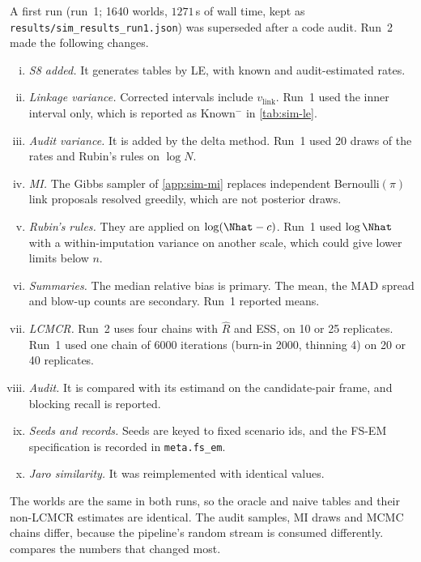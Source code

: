 A first run (run~1; 1640 worlds, $1271$\,s of wall time, kept as \texttt{results/sim\_results\_run1.json}) was superseded after a code audit. Run~2 made the following changes.
\begin{enumerate}[(i)]
  \item \emph{S8 added.} It generates tables by LE, with known and audit-estimated rates.
  \item \emph{Linkage variance.} Corrected intervals include $v_{\mathrm{link}}$. Run~1 used the inner interval only, which is reported as Known$^-$ in \cref{tab:sim-le}.
  \item \emph{Audit variance.} It is added by the delta method. Run~1 used 20 draws of the rates and Rubin's rules on $\log N$.
  \item \emph{MI.} The Gibbs sampler of \cref{app:sim-mi} replaces independent Bernoulli$(\pi)$ link proposals resolved greedily, which are not posterior draws.
  \item \emph{Rubin's rules.} They are applied on $\log(\Nhat-c)$. Run~1 used $\log\Nhat$ with a within-imputation variance on another scale, which could give lower limits below $n$.
  \item \emph{Summaries.} The median relative bias is primary. The mean, the MAD spread and blow-up counts are secondary. Run~1 reported means.
  \item \emph{LCMCR.} Run~2 uses four chains with $\widehat R$ and ESS, on 10 or 25 replicates. Run~1 used one chain of 6000 iterations (burn-in 2000, thinning 4) on 20 or 40 replicates.
  \item \emph{Audit.} It is compared with its estimand on the candidate-pair frame, and blocking recall is reported.
  \item \emph{Seeds and records.} Seeds are keyed to fixed scenario ids, and the FS-EM specification is recorded in \texttt{meta.fs\_em}.
  \item \emph{Jaro similarity.} It was reimplemented with identical values.
\end{enumerate}
The worlds are the same in both runs, so the oracle and naive tables and their non-LCMCR estimates are identical. The audit samples, MI draws and MCMC chains differ, because the pipeline's random stream is consumed differently.  compares the numbers that changed most.

